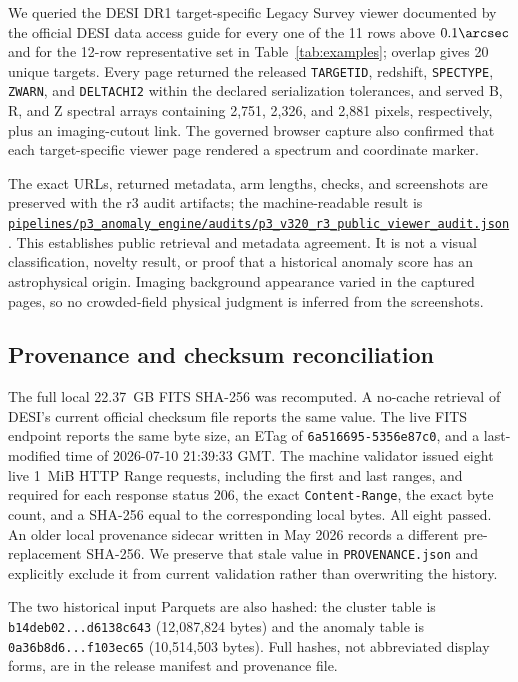 \documentclass[twocolumn]{aastex701}
\newcommand{\repoBase}{https://github.com/Hubify-Projects/bigbounce/blob/main}
\newcommand{\artifact}[1]{\href{\repoBase/#1}{\nolinkurl{#1}}}
\begin{document}
We queried the DESI DR1 target-specific Legacy Survey viewer documented by the official DESI data
access guide for every one of the 11 rows above $0.1\arcsec$ and for the 12-row representative set
in Table~\ref{tab:examples}; overlap gives 20 unique targets.  Every page returned the released
\texttt{TARGETID}, redshift, \texttt{SPECTYPE}, \texttt{ZWARN}, and \texttt{DELTACHI2} within the
declared serialization tolerances, and served B, R, and Z spectral arrays containing 2,751,
2,326, and 2,881 pixels, respectively, plus an imaging-cutout link.  The governed browser capture
also confirmed that each target-specific viewer page rendered a spectrum and coordinate marker.

The exact URLs, returned metadata, arm lengths, checks, and screenshots are preserved with the r3
audit artifacts; the machine-readable result is
\artifact{pipelines/p3\_anomaly\_engine/audits/p3\_v320\_r3\_public\_viewer\_audit.json}.
This establishes public retrieval and metadata agreement.  It is not a visual classification,
novelty result, or proof that a historical anomaly score has an astrophysical origin.  Imaging
background appearance varied in the captured pages, so no crowded-field physical judgment is
inferred from the screenshots.

\subsection{Provenance and checksum reconciliation}\label{sec:checksums}

The full local 22.37~GB FITS SHA-256 was recomputed.  A no-cache retrieval of DESI's current
official checksum file reports the same value.  The live FITS endpoint reports the same byte size,
an ETag of \texttt{6a516695-5356e87c0}, and a last-modified time of 2026-07-10 21:39:33 GMT.  The
machine validator issued eight live 1~MiB HTTP Range requests, including the first and last
ranges, and required for each response status 206, the exact \texttt{Content-Range}, the exact
byte count, and a SHA-256 equal to the corresponding local bytes.  All eight passed.  An older
local provenance sidecar written in May 2026 records a
different pre-replacement SHA-256.  We preserve that stale value in \texttt{PROVENANCE.json} and
explicitly exclude it from current validation rather than overwriting the history.

The two historical input Parquets are also hashed: the cluster table is
\texttt{b14deb02...d6138c643} (12,087,824 bytes) and the anomaly table is
\texttt{0a36b8d6...f103ec65} (10,514,503 bytes).  Full hashes, not abbreviated display forms, are in
the release manifest and provenance file.
\end{document}
